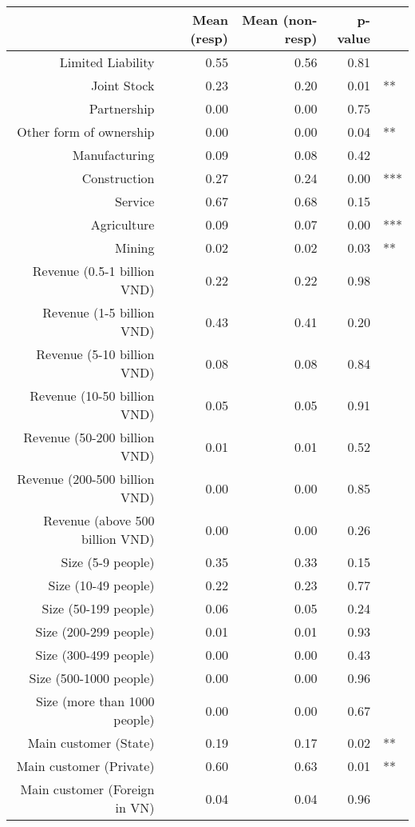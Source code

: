 \begin{table}[H]
\centering
\begin{tabular}{rrrrl}
  \hline
 & Mean (resp) & Mean (non-resp) & p-value &   \\ 
  \hline
Limited Liability & 0.55 & 0.56 & 0.81 &  \\ 
  Joint Stock & 0.23 & 0.20 & 0.01 & ** \\ 
  Partnership & 0.00 & 0.00 & 0.75 &  \\ 
  Other form of ownership & 0.00 & 0.00 & 0.04 & ** \\ 
  Manufacturing & 0.09 & 0.08 & 0.42 &  \\ 
  Construction & 0.27 & 0.24 & 0.00 & *** \\ 
  Service & 0.67 & 0.68 & 0.15 &  \\ 
  Agriculture & 0.09 & 0.07 & 0.00 & *** \\ 
  Mining & 0.02 & 0.02 & 0.03 & ** \\ 
  Revenue (0.5-1 billion VND) & 0.22 & 0.22 & 0.98 &  \\ 
  Revenue (1-5 billion VND) & 0.43 & 0.41 & 0.20 &  \\ 
  Revenue (5-10 billion VND) & 0.08 & 0.08 & 0.84 &  \\ 
  Revenue (10-50 billion VND) & 0.05 & 0.05 & 0.91 &  \\ 
  Revenue (50-200 billion VND) & 0.01 & 0.01 & 0.52 &  \\ 
  Revenue (200-500 billion VND) & 0.00 & 0.00 & 0.85 &  \\ 
  Revenue (above 500 billion VND) & 0.00 & 0.00 & 0.26 &  \\ 
  Size (5-9 people) & 0.35 & 0.33 & 0.15 &  \\ 
  Size (10-49 people) & 0.22 & 0.23 & 0.77 &  \\ 
  Size (50-199 people) & 0.06 & 0.05 & 0.24 &  \\ 
  Size (200-299 people) & 0.01 & 0.01 & 0.93 &  \\ 
  Size (300-499 people) & 0.00 & 0.00 & 0.43 &  \\ 
  Size (500-1000 people) & 0.00 & 0.00 & 0.96 &  \\ 
  Size (more than 1000 people) & 0.00 & 0.00 & 0.67 &  \\ 
  Main customer (State) & 0.19 & 0.17 & 0.02 & ** \\ 
  Main customer (Private) & 0.60 & 0.63 & 0.01 & ** \\ 
  Main customer (Foreign in VN) & 0.04 & 0.04 & 0.96 &  \\ 

\end{tabular}
\end{table}

